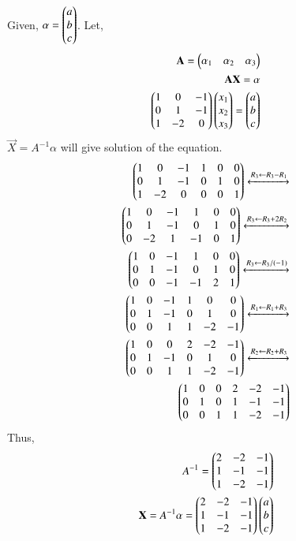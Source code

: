Given, $\alpha = \begin{pmatrix}a\\b\\c\end{pmatrix}$.
Let,
\begin{align}
\mathbf{A}=\begin{pmatrix}\alpha_1&\alpha_2&\alpha_3\end{pmatrix}\\
\mathbf{A}\mathbf{X}=\alpha\\
\begin{pmatrix}1 & 0 & -1\\0 & 1 & -1\\1 & -2 & 0\end{pmatrix}\begin{pmatrix}x_1\\x_2\\x_3\end{pmatrix} = \begin{pmatrix}a\\b\\c\end{pmatrix}
\end{align}
$ \vec{X}=A^{-1}\alpha$ will give solution of the equation.
\begin{align}
\begin{pmatrix}1 & 0 & -1 & 1 & 0 & 0\\
0 & 1 & -1 & 0 & 1 & 0\\
1 & -2 & 0 & 0 & 0 & 1\end{pmatrix}\xleftrightarrow[]{R_3\leftarrow R_3-R_1}\\
\begin{pmatrix}1 & 0 & -1 & 1 & 0 & 0\\
0 & 1 & -1 & 0 & 1 & 0\\
0 & -2 & 1 & -1 & 0 & 1\end{pmatrix}
\xleftrightarrow[]{R_3\leftarrow R_3+2R_2}\\
\begin{pmatrix}1 & 0 & -1 & 1 & 0 & 0\\
0 & 1 & -1 & 0 & 1 & 0\\
0 & 0 & -1 & -1 & 2 & 1\end{pmatrix}\xleftrightarrow[]{R_3\leftarrow R_3/(-1)}\\
\begin{pmatrix}1 & 0 & -1 & 1 & 0 & 0\\
0 & 1 & -1 & 0 & 1 & 0\\
0 & 0 & 1 & 1 & -2 & -1\end{pmatrix}\xleftrightarrow{R_1\leftarrow R_1+R_3}\\
\begin{pmatrix}1 & 0 & 0 & 2 & -2 & -1\\
0 & 1 & -1 & 0 & 1 & 0\\
0 & 0 & 1 & 1 & -2 & -1\end{pmatrix}\xleftrightarrow{R_2\leftarrow R_2+R_3}\\
\begin{pmatrix}1 & 0 & 0 & 2 & -2 & -1\\
0 & 1 & 0 & 1 & -1 & -1\\
0 & 0 & 1 & 1 & -2 & -1\end{pmatrix}
\end{align}
Thus,
\begin{align}
    A^{-1}=\begin{pmatrix}
    2 &-2&-1\\
    1&-1&-1\\
    1&-2&-1
    \end{pmatrix}\\
\mathbf{X} = A^{-1}\alpha=\begin{pmatrix}2 &-2&-1\\1&-1&-1\\1&-2&-1\end{pmatrix}
\begin{pmatrix}a\\b\\c\end{pmatrix}
\end{align}
